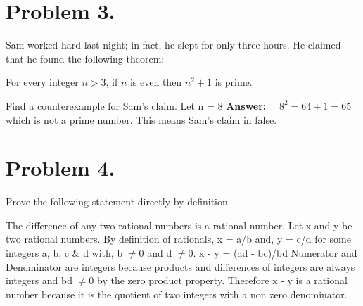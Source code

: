 \documentclass[11pt]{article}
\begin{document}
\newpage

\section*{Problem 3.}

Sam worked hard last night; in fact, he slept for only three hours. He claimed that he found the following theorem:

For every integer $n>3$, if $n$ is even then $n^2+1$ is prime.
\newline

\noindent
Find a counterexample for Sam's claim.
\newline
\newline
Let n = 8
\newline
{\bf Answer:}~~ $8^2 = 64 + 1 = 65$ which is not a prime number. This means Sam's claim in false.


\newpage

\noindent
\section*{Problem 4.}

Prove the following statement directly by definition.
\newline

The difference of any two rational numbers is a rational number.
\newline
\newline
Let x and y be two rational numbers. By definition of rationals, x = a/b and, 
\newline
y = c/d for some integers a, b, c \& d with, b $\neq 0$ and d $\neq 0$.
\newline
\newline
x - y = (ad - bc)/bd
\newline
\newline
Numerator and Denominator are integers because products and differences of integers are always integers and bd $\neq 0$ by the zero product property.
\newline
\newline
Therefore x - y is a rational number because it is the quotient of two integers with a non zero denominator.

\newpage
\end{document}
